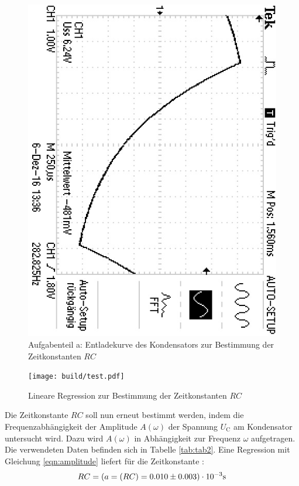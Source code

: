 \begin{figure}
	\centering
	\includegraphics[angle=90]{bilder/F0000TEK.JPG}
	\caption{Aufgabenteil a: Entladekurve des Kondensators zur Bestimmung der Zeitkonstanten $RC$}
	\label{fig:plotrc}
\end{figure}

\begin{figure}
	\centering
	\texttt{[image: build/test.pdf]}
	\caption{Lineare Regression zur Bestimmung der Zeitkonstanten $RC$}
	\label{fig:plota}
\end{figure}

Die Zeitkonstante $RC$ soll nun erneut bestimmt werden, indem die Frequenzabhängigkeit der Amplitude $A(\omega)$ der Spannung $U_\text{C}$ am Kondensator untersucht wird.
Dazu wird $A(\omega)$ in Abhängigkeit zur Frequenz $\omega$ aufgetragen. Die verwendeten Daten befinden sich in Tabelle \ref{tab:tab2}.
Eine Regression mit Gleichung \eqref{eqn:amplitude} liefert für die Zeitkonstante :
\begin{equation*}
	\centering
	RC=(a = (RC) = 0.010 \pm 0.003)\cdot 10^{-3} \si{\second}
\end{equation*}


